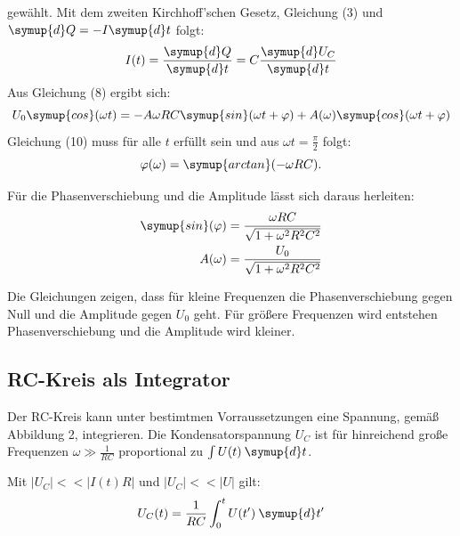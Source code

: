 gewählt. Mit dem zweiten Kirchhoff'schen Gesetz, Gleichung (3) und $\symup{d}Q = -I\symup{d}t$ folgt:
\begin{equation}
  I(t) = \frac{\symup{d}Q}{\symup{d}t} = C\frac{\symup{d}U_C}{\symup{d}t}
\end{equation}
Aus Gleichung (8) ergibt sich:
\begin{equation}
  U_0 \symup{cos}(\omega t) = -A \omega RC \symup{sin}(\omega t + \varphi) + A(\omega) \symup{cos}(\omega t + \varphi)
\end{equation}
Gleichung (10) muss für alle $t$ erfüllt sein und aus $\omega t = \frac{\pi}{2}$ folgt:
\begin{equation}
  \varphi (\omega) = \symup{arctan} (-\omega RC).
\end{equation}

Für die Phasenverschiebung und die Amplitude lässt sich daraus herleiten:
\begin{align}
  \symup{sin}(\varphi) &= \frac{\omega RC}{\sqrt{1 + \omega^2 R^2C^2}} \\
  A(\omega) &= \frac{U_0}{\sqrt{1 + \omega^2 R^2C^2}}
\end{align}

Die Gleichungen zeigen, dass für kleine Frequenzen die Phasenverschiebung gegen Null und die Amplitude
gegen $U_0$ geht. Für größere Frequenzen wird entstehen Phasenverschiebung und die Amplitude wird kleiner.

\subsection{RC-Kreis als Integrator}
Der RC-Kreis kann unter bestimtmen Vorraussetzungen eine Spannung, gemäß Abbildung 2, integrieren.
Die Kondensatorspannung $U_C$ ist für hinreichend große Frequenzen $\omega \gg \frac{1}{RC}$ proportional
zu $\int U(t) \: \symup{d}t$.

Mit $|U_C| << |I(t)R|$ und $|U_C| << |U|$ gilt:
\begin{equation}
  U_C(t) = \frac{1}{RC} \int_{0}^{t} U(t') \: \symup{d}t'
\end{equation}
